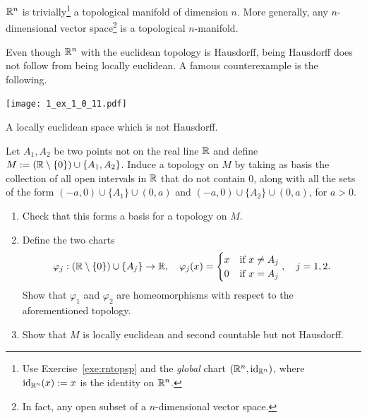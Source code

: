 \begin{example}
  $\mathbb{R}^n$ is trivially\footnote{Use Exercise~\ref{exe:rntopsp} and the \emph{global} chart $(\mathbb{R}^n, \operatorname{id}_{\mathbb{R}^n})$, where $\operatorname{id}_{\mathbb{R}^n}(x) := x$ is the identity on $\mathbb{R}^n$.} a topological manifold of dimension $n$.
  More generally, any $n$-dimensional vector space\footnote{In fact, any open subset of a $n$-dimensional vector space.} is a topological $n$-manifold.
\end{example}

\begin{exercise}
  Even though $\mathbb{R}^n$ with the euclidean topology is Hausdorff, being Hausdorff does not follow from being locally euclidean. A famous counterexample is the following.
  \begin{marginfigure}
    \texttt{[image: 1\_ex\_1\_0\_11.pdf]}
    \label{fig:hausdorff-not-locally-euclidean}
    \caption{A locally euclidean space which is not Hausdorff.}
  \end{marginfigure}
  Let $A_1, A_2$ be two points not on the real line $\mathbb{R}$ and define $M:= (\mathbb{R}\setminus\{0\})\cup\{A_1,A_2\}$.
  Induce a topology on $M$ by taking as basis the collection of all open intervals in $\mathbb{R}$ that do not contain $0$, along with all the sets of the form $(-a, 0)\cup\{A_1\}\cup(0,a)$ and $(-a, 0)\cup\{A_2\}\cup(0,a)$, for $a>0$.
  \begin{enumerate}
    \item Check that this forms a basis for a topology on $M$.
    \item Define the two charts
          \begin{equation}
            \varphi_j:(\mathbb{R}\setminus\{0\})\cup\{A_j\} \to \mathbb{R}, \quad
            \varphi_j(x) = \begin{cases} x &\mbox{if } x\neq A_j\\ 0 & \mbox{if } x = A_j \end{cases}, \quad
            j = 1,2.
          \end{equation}
          Show that $\varphi_1$ and $\varphi_2$ are homeomorphisms with respect to the aforementioned topology.
    \item Show that $M$ is locally euclidean and second countable but not Hausdorff.
  \end{enumerate}
\end{exercise}

